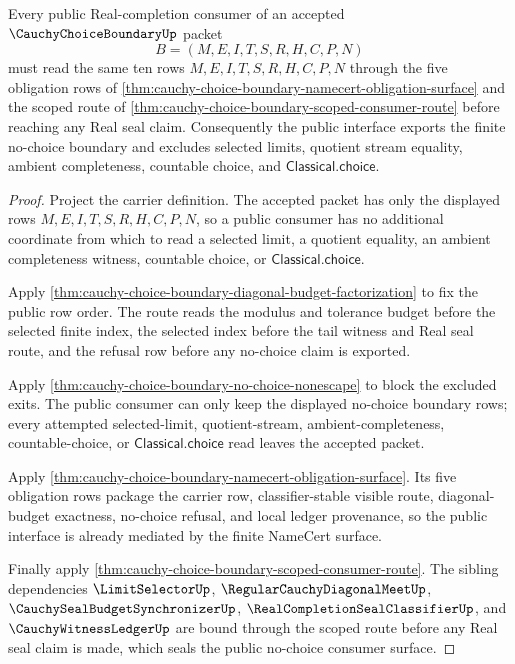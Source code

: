 \begin{theorem}
\label{thm:cauchy-choice-boundary-public-consumer-seal}
Every public Real-completion consumer of an accepted $\CauchyChoiceBoundaryUp$ packet
$$
B=(M,E,I,T,S,R,H,C,P,N)
$$
must read the same ten rows $M,E,I,T,S,R,H,C,P,N$ through the five obligation rows of \autoref{thm:cauchy-choice-boundary-namecert-obligation-surface} and the scoped route of \autoref{thm:cauchy-choice-boundary-scoped-consumer-route} before reaching any Real seal claim. Consequently the public interface exports the finite no-choice boundary and excludes selected limits, quotient stream equality, ambient completeness, countable choice, and $\mathsf{Classical.choice}$.
\end{theorem}
\begin{proof}
Project the carrier definition. The accepted packet has only the displayed rows $M,E,I,T,S,R,H,C,P,N$, so a public consumer has no additional coordinate from which to read a selected limit, a quotient equality, an ambient completeness witness, countable choice, or $\mathsf{Classical.choice}$.

Apply \autoref{thm:cauchy-choice-boundary-diagonal-budget-factorization} to fix the public row order. The route reads the modulus and tolerance budget before the selected finite index, the selected index before the tail witness and Real seal route, and the refusal row before any no-choice claim is exported.

Apply \autoref{thm:cauchy-choice-boundary-no-choice-nonescape} to block the excluded exits. The public consumer can only keep the displayed no-choice boundary rows; every attempted selected-limit, quotient-stream, ambient-completeness, countable-choice, or $\mathsf{Classical.choice}$ read leaves the accepted packet.

Apply \autoref{thm:cauchy-choice-boundary-namecert-obligation-surface}. Its five obligation rows package the carrier row, classifier-stable visible route, diagonal-budget exactness, no-choice refusal, and local ledger provenance, so the public interface is already mediated by the finite NameCert surface.

Finally apply \autoref{thm:cauchy-choice-boundary-scoped-consumer-route}. The sibling dependencies $\LimitSelectorUp$, $\RegularCauchyDiagonalMeetUp$, $\CauchySealBudgetSynchronizerUp$, $\RealCompletionSealClassifierUp$, and $\CauchyWitnessLedgerUp$ are bound through the scoped route before any Real seal claim is made, which seals the public no-choice consumer surface.
\end{proof}

